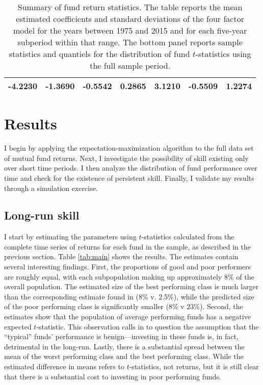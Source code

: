 \begin{table}[p]
\begin{tabular}{*{7}{c}}
		\midrule
		-4.2230 & -1.3690 & -0.5542 & 0.2865 & 3.1210 & -0.5509 & 1.2274 \\
		\bottomrule
		\end{tabular}
		\captionsetup{position=below, font=footnotesize, justification=justified, width=0.83\linewidth}
		\caption[Summary of fund return statistics]{Summary of fund return statistics. The table reports the mean estimated coefficients and standard deviations of the \citet{Carhart1997} four factor model for the years between 1975 and 2015 and for each five-year subperiod within that range. The bottom panel reports sample statistics and quantiels for the distribution of fund $t$-statistics using the full sample period.}
		\label{tab:summary}
	\end{table}


\section{Results}
	I begin by applying the expectation-maximization algorithm to the full data set of mutual fund returns. Next, I investigate the possibility of skill existing only over short time periods. I then analyze the distribution of fund performance over time and check for the existence of persistent skill. Finally, I validate my results through a simulation exercise.

	\subsection{Long-run skill}
		I start by estimating the parameters using $t$-statistics calculated from the complete time series of returns for each fund in the sample, as described in the previous section. Table \ref{tab:main} shows the results. The estimates contain several interesting findings.  First, the proportions of good and poor performers are roughly equal, with each subpopulation making up approximately 8\% of the overall population.  The estimated size of the best performing class is much larger than the corresponding estimate found in \citet{Barras2010} (8\% v. 2.5\%), while the predicted size of the poor performing class is significantly smaller (8\% v 23\%). Second, the estimates show that the population of average performing funds has a negative expected $t$-statistic.  This observation calls in to question the assumption that the ``typical'' funds' performance is benign---investing in these funds is, in fact, detrimental in the long-run.  Lastly, there is a substantial spread between the mean of the worst performing class and the best performing class. While the estimated difference in means refers to $t$-statistics, not returns, but it is still clear that there is a substantial cost to investing in poor performing funds.

